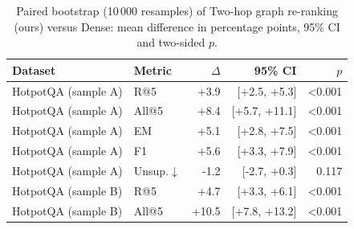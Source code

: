 \begin{table}[t]
\centering
\small
\caption{Paired bootstrap (10\,000 resamples) of Two-hop graph re-ranking (ours) versus Dense: mean difference in percentage points, 95\% CI and two-sided $p$.}
\label{tab:signif}
\begin{tabular}{llrrr}
\toprule
Dataset & Metric & $\Delta$ & 95\% CI & $p$ \\
\midrule
HotpotQA (sample A) & R@5 & +3.9 & [+2.5, +5.3] & <0.001 \\
HotpotQA (sample A) & All@5 & +8.4 & [+5.7, +11.1] & <0.001 \\
HotpotQA (sample A) & EM & +5.1 & [+2.8, +7.5] & <0.001 \\
HotpotQA (sample A) & F1 & +5.6 & [+3.3, +7.9] & <0.001 \\
HotpotQA (sample A) & Unsup.$\downarrow$ & -1.2 & [-2.7, +0.3] & 0.117 \\
HotpotQA (sample B) & R@5 & +4.7 & [+3.3, +6.1] & <0.001 \\
HotpotQA (sample B) & All@5 & +10.5 & [+7.8, +13.2] & <0.001 \\
\bottomrule
\end{tabular}
\end{table}
